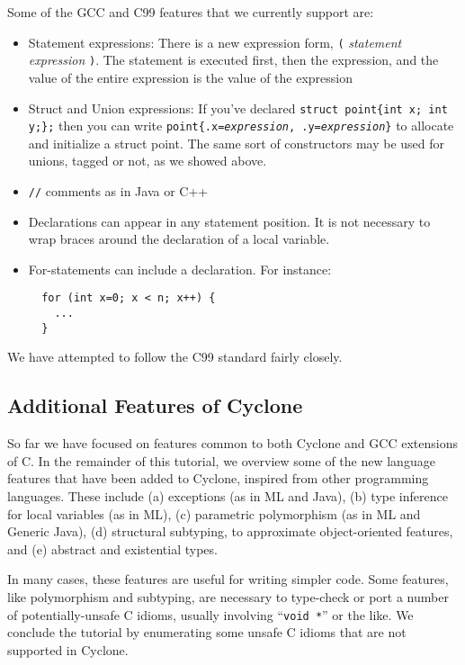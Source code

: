 Some of the GCC and C99 features that we currently support are:
\begin{itemize}
\item Statement expressions: There is a new expression form,
  \texttt{(\lb} \textit{statement} \textit{expression} \texttt{\rb)}.
  The statement is executed first, then the expression, and the value
  of the entire expression is the value of the expression
\item Struct and Union expressions:  If you've declared
  \texttt{struct point\{int x; int y;\};} then you can write
  \texttt{point\{.x=\textit{expression}, .y=\textit{expression}\}}
 to allocate and initialize a struct point.  The same sort of
 constructors may be used for unions, tagged or not, as we showed
  above.
\item \texttt{//} comments as in Java or C++
\item Declarations can appear in any statement position.  It is not
  necessary to wrap braces around the declaration of a local variable.
\item For-statements can include a declaration. For instance:
\begin{verbatim}
  for (int x=0; x < n; x++) { 
    ...
  }
\end{verbatim}
\end{itemize}
We have attempted to follow the C99 standard fairly closely.

\subsection{Additional Features of Cyclone}

So far we have focused on features common to both Cyclone and GCC
extensions of C\@.  In the remainder of this tutorial, we overview
some of the new language features that have been added to Cyclone,
inspired from other programming languages.  These include (a)
exceptions (as in ML and Java), (b) type inference for local
variables (as in ML), (c) parametric polymorphism (as in ML and
Generic Java), (d) structural subtyping, to approximate
object-oriented features, and (e) abstract and existential types.  

In many cases, these features are useful for writing simpler code.
Some features, like polymorphism and subtyping, are necessary to
type-check or port a number of potentially-unsafe C idioms, usually
involving ``\texttt{void *}'' or the like.  We conclude the tutorial
by enumerating some unsafe C idioms that are not supported in Cyclone.

